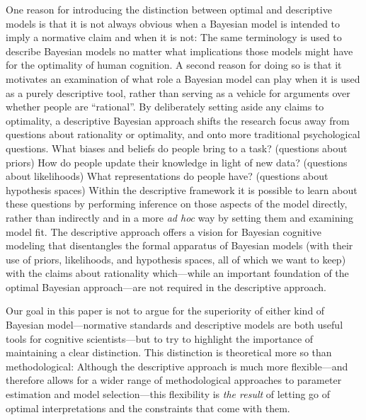 \documentclass[doc,floatsintext]{apa6}
\begin{document}
One reason for introducing the distinction between optimal and descriptive models  is that it is not always obvious when a Bayesian model is intended to imply a normative claim and when it is not: The same terminology is used to describe Bayesian models no matter what implications those models might have for the optimality of human cognition. A second reason for doing so is that it motivates an examination of what role a Bayesian model can play when it is used as a purely descriptive tool, rather than serving as a vehicle for arguments over whether people are ``rational''. By deliberately setting aside any claims to optimality, a descriptive Bayesian approach shifts the research focus away from questions about rationality or optimality, and onto more traditional psychological questions. What biases and beliefs do people bring to a task? (questions about priors) How do people update their knowledge in light of new data? (questions about likelihoods) What representations do people have? (questions about hypothesis spaces) Within the descriptive framework it is possible to learn about these questions by performing inference on those aspects of the model directly, rather than indirectly and in a more {\it ad hoc} way by setting them and examining model fit. The descriptive approach offers a vision for Bayesian cognitive modeling that disentangles the formal apparatus of Bayesian models (with their use of priors, likelihoods, and hypothesis spaces, all of which we want to keep) with the claims about rationality which---while an important foundation of the optimal Bayesian approach---are not required in the descriptive approach.

Our goal in this paper is not to argue for the superiority of either kind of Bayesian model---normative standards and descriptive models are both useful tools for cognitive scientists---but to try to highlight the importance of maintaining a clear distinction. This distinction is theoretical more so than methodological: Although the descriptive approach is much more flexible---and therefore allows for a wider range of methodological approaches to parameter estimation and model selection---this flexibility is \textit{the result} of letting go of optimal interpretations and the constraints that come with them.
\end{document}
